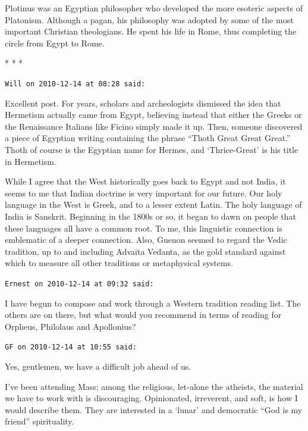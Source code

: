 Plotinus was an Egyptian philosopher who developed the more esoteric aspects of Platonism. Although a pagan, his philosophy was adopted by some of the most important Christian theologians. He spent his life in Rome, thus completing the circle from Egypt to Rome.



\begin{center}* * *\end{center}

\begin{footnotesize}
\begin{sffamily}
\texttt{Will on 2010-12-14 at 08:28 said:}

Excellent post. For years, scholars and archeologists dismissed the idea that Hermetism actually came from Egypt, believing instead that either the Greeks or the Renaissance Italians like Ficino simply made it up. Then, someone discovered a piece of Egyptian writing containing the phrase ``Thoth Great Great Great.'' Thoth of course is the Egyptian name for Hermes, and `Thrice-Great' is his title in Hermetism.

While I agree that the West historically goes back to Egypt and not India, it seems to me that Indian doctrine is very important for our future. Our holy language in the West is Greek, and to a lesser extent Latin. The holy language of India is Sanskrit. Beginning in the 1800s or so, it began to dawn on people that these languages all have a common root. To me, this linguistic connection is emblematic of a deeper connection. Also, Guenon seemed to regard the Vedic tradition, up to and including Advaita Vedanta, as the gold standard against which to measure all other traditions or metaphysical systems.

\hfill

\texttt{Ernest on 2010-12-14 at 09:32 said:}

I have begun to compose and work through a Western tradition reading list. The others are on there, but what would you recommend in terms of reading for Orpheus, Philolaus and Apollonius?

\hfill

\texttt{GF on 2010-12-14 at 10:55 said:}

Yes, gentlemen, we have a difficult job ahead of us.

I've been attending Mass; among the religious, let-alone the atheists, the material we have to work with is discouraging. Opinionated, irreverent, and soft, is how I would describe them. They are interested in a `lunar' and democratic ``God is my friend'' spirituality.


\end{sffamily}
\end{footnotesize}
